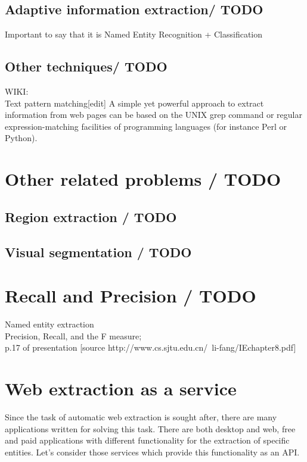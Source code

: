 \subsection{Adaptive information extraction/ TODO}

Important to say that it is Named Entity Recognition + Classification 
\subsection{Other techniques/ TODO}

WIKI:\\
Text pattern matching[edit]
A simple yet powerful approach to extract information from web pages can be based on the UNIX grep command or regular expression-matching facilities of programming languages (for instance Perl or Python).



\section{Other related problems / TODO}

\subsection{Region extraction / TODO}
\subsection{Visual segmentation / TODO}


\section{Recall and Precision / TODO}

Named entity extraction\\
Precision, Recall, and the
F measure;\\
p.17 of presentation
[source http://www.cs.sjtu.edu.cn/~li-fang/IEchapter8.pdf]

\section{Web extraction as a service}

Since the task of automatic web extraction is sought after, there are many applications written for solving this task. There are both desktop and web, free and paid applications with different functionality for the extraction of specific entities. Let's consider those services which provide this functionality as an API.\\


